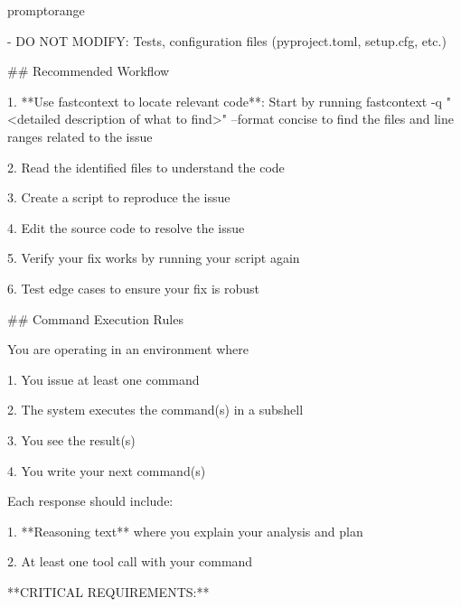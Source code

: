 \documentclass{llmxive}
\begin{document}
\begin{promptbox}{promptorange}
{- DO NOT MODIFY: Tests, configuration files (pyproject.toml, setup.cfg, etc.)\par
\vspace{0.35em}\par
\#\# Recommended Workflow\par
\vspace{0.35em}\par
1. **Use fastcontext to locate relevant code**: Start by running \textasciigrave{}fastcontext -q "\textless{}detailed description of what to find\textgreater{}" --format concise\textasciigrave{} to find the files and line ranges related to the issue\par
2. Read the identified files to understand the code\par
3. Create a script to reproduce the issue\par
4. Edit the source code to resolve the issue\par
5. Verify your fix works by running your script again\par
6. Test edge cases to ensure your fix is robust\par
\vspace{0.35em}\par
\#\# Command Execution Rules\par
\vspace{0.35em}\par
You are operating in an environment where\par
\vspace{0.35em}\par
1. You issue at least one command\par
2. The system executes the command(s) in a subshell\par
3. You see the result(s)\par
4. You write your next command(s)\par
\vspace{0.35em}\par
Each response should include:\par
\vspace{0.35em}\par
1. **Reasoning text** where you explain your analysis and plan\par
2. At least one tool call with your command\par
\vspace{0.35em}\par
**CRITICAL REQUIREMENTS:**\par
\vspace{0.35em}\par
}
\end{promptbox}
\end{document}
